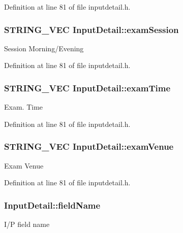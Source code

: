 Definition at line 81 of file inputdetail.\-h.

\hypertarget{classInputDetail_a4501d1379c278965497abf21d369ad9e}{
\subsubsection[{exam\-Session}]{\setlength{\rightskip}{0pt plus 5cm}S\-T\-R\-I\-N\-G\-\_\-\-V\-E\-C Input\-Detail\-::exam\-Session\hspace{0.3cm}{\ttfamily [protected]}}}\label{classInputDetail_a4501d1379c278965497abf21d369ad9e}
Session Morning/\-Evening 

Definition at line 81 of file inputdetail.\-h.

\hypertarget{classInputDetail_a847dd8bb2f0c43960746cfa4d2310a15}{
\subsubsection[{exam\-Time}]{\setlength{\rightskip}{0pt plus 5cm}S\-T\-R\-I\-N\-G\-\_\-\-V\-E\-C Input\-Detail\-::exam\-Time\hspace{0.3cm}{\ttfamily [protected]}}}\label{classInputDetail_a847dd8bb2f0c43960746cfa4d2310a15}
Exam. Time 

Definition at line 81 of file inputdetail.\-h.

\hypertarget{classInputDetail_a695928668a413ac052776c0b6cb27501}{
\subsubsection[{exam\-Venue}]{\setlength{\rightskip}{0pt plus 5cm}S\-T\-R\-I\-N\-G\-\_\-\-V\-E\-C Input\-Detail\-::exam\-Venue\hspace{0.3cm}{\ttfamily [protected]}}}\label{classInputDetail_a695928668a413ac052776c0b6cb27501}
Exam Venue 

Definition at line 81 of file inputdetail.\-h.

\hypertarget{classInputDetail_ac6f85380c5152c406d483726382c4798}{
\subsubsection[{field\-Name}]{ Input\-Detail\-::field\-Name}}\label{classInputDetail_ac6f85380c5152c406d483726382c4798}
I/\-P field name 

